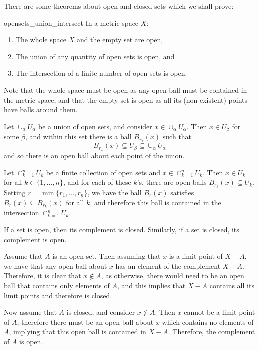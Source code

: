 There are some theorems about open and closed sets which we shall prove:
\begin{btheorem}{}{opensets_union_intersect}
In a metric space $X$:
\begin{enumerate}
    \item The whole space $X$ and the empty set are open,
    \item The union of any quantity of open sets is open, and
    \item The intersection of a finite number of open sets is open.
\end{enumerate}
\end{btheorem}

Note that the whole space must be open as any open ball must be contained in the metric space, and that the empty set is open as all its (non-existent) points have balls around them.

\begin{bproof}{}{}
Let $\cup_{\alpha} U_{\alpha}$ be a union of open sets, and consider $x \in \cup_{\alpha} U_{\alpha}$. Then $x \in U_{\beta}$ for some $\beta$, and within this set there is a ball $B_{r_{x}}(x)$ such that \[B_{r_{x}}(x) \subseteq U_{\beta} \subseteq \cup_{\alpha} U_{\alpha}\] and so there is an open ball about each point of the union.

Let $\cap_{k=1}^{n} U_{k}$ be a finite collection of open sets and $x \in \cap_{k=1}^{n} U_{k}$. Then $x \in U_{k}$ for all $k \in \{1, \ldots, n \}$, and for each of these $k$'s, there are open balls $B_{r_{k}}(x) \subseteq U_{k}$. Setting $r = \min\{r_{1}, \ldots, r_{n}\}$, we have the ball $B_{r}(x)$ satisfies $B_{r}(x) \subseteq B_{r_{k}}(x)$ for all $k$, and therefore this ball is contained in the intersection $\cap_{k=1}^{n} U_{k}$.
\eop
\end{bproof}

\begin{btheorem}{}{}
If a set is open, then its complement is closed. Similarly, if a set is closed, its complement is open.
\end{btheorem}
\begin{bproof}{}{}
Assume that $A$ is an open set. Then assuming that $x$ is a limit point of $X - A$, we have that any open ball about $x$ has an element of the complement $X - A$. Therefore, it is clear that $x \not\in A$, as otherwise, there would need to be an open ball that contains only elements of $A$, and this implies that $X- A$ contains all its limit points and therefore is closed.

Now assume that $A$ is closed, and consider $x \not\in A$. Then $x$ cannot be a limit point of $A$, therefore there must be an open ball about $x$ which contains no elements of $A$, implying that this open ball is contained in $X - A$. Therefore, the complement of $A$ is open.
\eop
\end{bproof}

